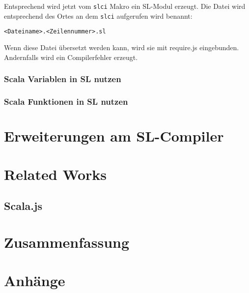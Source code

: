 \documentclass[12pt]{scrreprt}
\begin{document}
Entsprechend wird jetzt vom \lstinline!slci! Makro ein \ac{SL}-Modul erzeugt. Die Datei wird entsprechend des Ortes an dem \lstinline!slci! aufgerufen wird benannt:
\begin{center}
\lstinline!<Dateiname>.<Zeilennummer>.sl!
\end{center}
Wenn diese Datei übersetzt werden kann, wird sie mit require.js eingebunden. Andernfalls wird ein Compilerfehler erzeugt.

\subsection{Scala Variablen in SL nutzen}

\subsection{Scala Funktionen in SL nutzen}














\chapter{Erweiterungen am SL-Compiler}
\label{chap:dom-monad-extensions}

\chapter{Related Works}
\label{chap:related-works}

\section{Scala.js}
\label{sec:scala-js}

\section{}

\chapter{Zusammenfassung}
\label{chap:summary}

\chapter{Anhänge}
\label{chap:anhänge}
\end{document}
